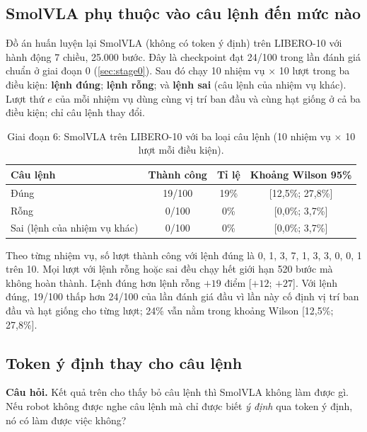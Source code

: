 \documentclass[a4paper,oneside]{report}
\begin{document}
\subsection{SmolVLA phụ thuộc vào câu lệnh đến mức nào}
\label{sec:libero}

Đồ án huấn luyện lại SmolVLA (không có token ý định) trên LIBERO-10 \citep{liu2023libero} với hành động 7 chiều, 25.000 bước. Đây là checkpoint đạt 24/100 trong lần đánh giá chuẩn ở giai đoạn 0 (\cref{sec:stage0}). Sau đó chạy 10 nhiệm vụ $\times$ 10 lượt trong ba điều kiện: \textbf{lệnh đúng}; \textbf{lệnh rỗng}; và \textbf{lệnh sai} (câu lệnh của nhiệm vụ khác). Lượt thứ $e$ của mỗi nhiệm vụ dùng cùng vị trí ban đầu và cùng hạt giống ở cả ba điều kiện; chỉ câu lệnh thay đổi.

\begin{table}[ht]
\centering
\caption{Giai đoạn 6: SmolVLA trên LIBERO-10 với ba loại câu lệnh (10 nhiệm vụ $\times$ 10 lượt mỗi điều kiện).}
\label{tab:libero}
\small
\begin{tabular}{lccc}
\toprule
Câu lệnh & Thành công & Tỉ lệ & Khoảng Wilson 95\% \citep{wilson1927probable} \\
\midrule
Đúng & 19/100 & 19\% & [12,5\%; 27,8\%] \\
Rỗng & 0/100 & 0\% & [0,0\%; 3,7\%] \\
Sai (lệnh của nhiệm vụ khác) & 0/100 & 0\% & [0,0\%; 3,7\%] \\
\bottomrule
\end{tabular}
\end{table}

Theo từng nhiệm vụ, số lượt thành công với lệnh đúng là 0, 1, 3, 7, 1, 3, 3, 0, 0, 1 trên 10. Mọi lượt với lệnh rỗng hoặc sai đều chạy hết giới hạn 520 bước mà không hoàn thành. Lệnh đúng hơn lệnh rỗng $+19$ điểm [$+12$; $+27$]. Với lệnh đúng, 19/100 thấp hơn 24/100 của lần đánh giá đầu vì lần này cố định vị trí ban đầu và hạt giống cho từng lượt; 24\% vẫn nằm trong khoảng Wilson [12,5\%; 27,8\%].

\subsection{Token ý định thay cho câu lệnh}
\label{sec:intention_only}

\textbf{Câu hỏi.} Kết quả trên cho thấy bỏ câu lệnh thì SmolVLA không làm được gì. Nếu robot không được nghe câu lệnh mà chỉ được biết \textit{ý định} qua token ý định, nó có làm được việc không?
\end{document}
